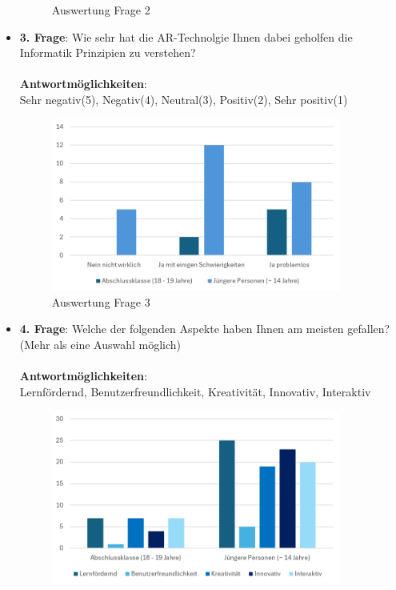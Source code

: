 \begin{itemize}
\begin{figure}[H]
        \caption{Auswertung Frage 2}
        \label{fig:fr1}
    \end{figure}
    \item \textbf{3. Frage}: Wie sehr hat die AR-Technolgie Ihnen dabei geholfen die Informatik Prinzipien zu verstehen?
    \\
    \\
    \textbf{Antwortmöglichkeiten}:\\
    Sehr negativ(5), Negativ(4), Neutral(3), Positiv(2), Sehr positiv(1)
    \\
    \begin{figure}[H]
        \centering
        \includegraphics[width=0.9\textwidth]{images/AuswertungFrage2}
        \caption{Auswertung Frage 3}
        \label{fig:fr1}
    \end{figure}
    \item \textbf{4. Frage}: Welche der folgenden Aspekte haben Ihnen am meisten gefallen? (Mehr als eine Auswahl möglich)
    \\
    \\
    \textbf{Antwortmöglichkeiten}:\\
    Lernfördernd, Benutzerfreundlichkeit, Kreativität, Innovativ, Interaktiv
    \\
    \begin{figure}[H]
        \centering
        \includegraphics[width=0.9\textwidth]{images/AuswertungFrage4}

\end{figure}
\end{itemize}

